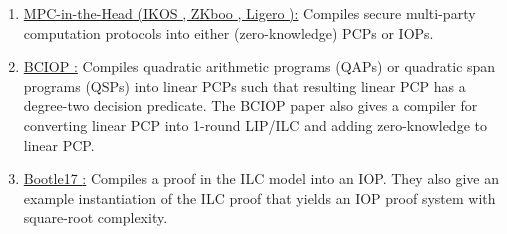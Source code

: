 	\begin{enumerate}[label=\alph*.]
  
	\item \underline{MPC-in-the-Head (IKOS \cite{2007:stoc:ZK-from-SMPC}, ZKboo \cite{2016:Sec:ZKBoo}, Ligero \cite{2017:ccs:ligero}):} 
	Compiles secure multi-party computation protocols into either (zero-knowledge) PCPs or IOPs.
  
	\item \underline{BCIOP \cite{2013:tcc:snargs-via-LIPs}:} 
	Compiles quadratic arithmetic programs (QAPs) or quadratic span programs (QSPs) into linear PCPs such that resulting linear PCP has a degree-two decision predicate. 
	The BCIOP paper also gives a compiler for converting linear PCP into 1-round LIP/ILC and adding zero-knowledge to linear PCP.
  
	\item \underline{Bootle17 \cite{2017:asiacrypt:linear-time-zkps-for-arithmetic}:} 
	Compiles a proof in the ILC model into an IOP.
	They also give an example instantiation of the ILC proof that yields an IOP proof system with square-root complexity.
	
	\end{enumerate}

